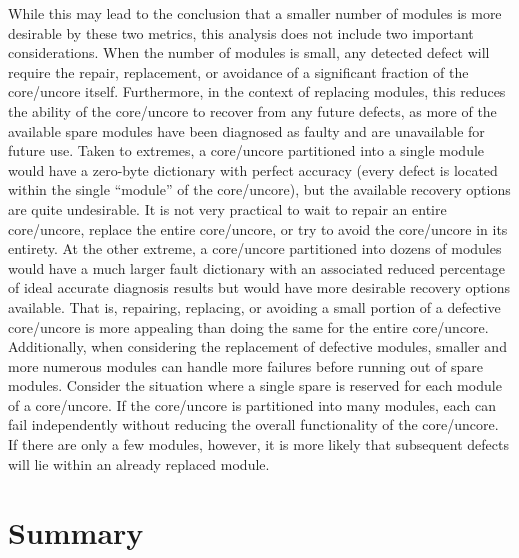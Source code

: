 While this may lead to the conclusion that a smaller number of modules is more desirable by these two metrics, this analysis does not include two important considerations.
%
When the number of modules is small, any detected defect will require the repair, replacement, or avoidance of a significant fraction of the core/uncore itself.
%
Furthermore, in the context of replacing modules, this reduces the ability of the core/uncore to recover from any future defects, as more of the available spare modules have been diagnosed as faulty and are unavailable for future use.
%
Taken to extremes, a core/uncore partitioned into a single module would have a zero-byte dictionary with perfect accuracy (every defect is located within the single ``module'' of the core/uncore), but the available recovery options are quite undesirable.
%
It is not very practical to wait to repair an entire core/uncore, replace the entire core/uncore, or try to avoid the core/uncore in its entirety.
%
At the other extreme, a core/uncore partitioned into dozens of modules would have a much larger fault dictionary with an associated reduced percentage of ideal accurate diagnosis results but would have more desirable recovery options available.
%
That is, repairing, replacing, or avoiding a small portion of a defective core/uncore is more appealing than doing the same for the entire core/uncore.
%
Additionally, when considering the replacement of defective modules, smaller and more numerous modules can handle more failures before running out of spare modules.
%
Consider the situation where a single spare is reserved for each module of a core/uncore.
%
If the core/uncore is partitioned into many modules, each can fail independently without reducing the overall functionality of the core/uncore.
%
If there are only a few modules, however, it is more likely that subsequent defects will lie within an already replaced module.

\section{Summary}
\label{sec:dict_summary}

